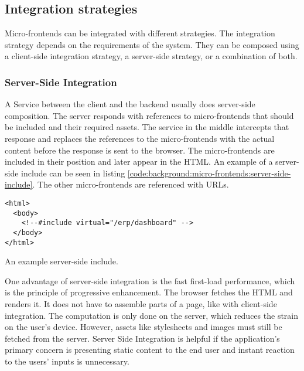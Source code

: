 \subsection{Integration strategies}\label{subsection:background:micro-frontend-architecture:integration-strategies}

Micro-frontends can be integrated with different strategies. The integration strategy depends on the requirements of the system. They can be composed using a client-side integration strategy, a server-side strategy, or a combination of both.

\subsubsection{Server-Side Integration}\label{subsubsection:background:micro-frontend-architecture:integration-strategies:server-side-integration}

A Service between the client and the backend usually does server-side composition. \cite[60]{book:2020:geers:background:micro-frontends:micro-frontends-in-action} The server responds with references to micro-frontends that should be included and their required assets. The service in the middle intercepts that response and replaces the references to the micro-frontends with the actual content before the response is sent to the browser. The micro-frontends are included in their position and later appear in the HTML. An example of a server-side include can be seen in listing \ref{code:background:micro-frontends:server-side-include}. The other micro-frontends are referenced with URLs. \cite[61-63]{book:2020:geers:background:micro-frontends:micro-frontends-in-action}

\ifshowListings
\begin{listing}[H]
    \begin{verbatim}
<html>
  <body>
    <!--#include virtual="/erp/dashboard" -->
  </body>
</html>
    \end{verbatim}
    \caption{An example server-side include.}\label{code:background:micro-frontends:server-side-include}
\end{listing}
\fi

\bigskip

\noindent One advantage of server-side integration is the fast first-load performance, which is the principle of progressive enhancement. \cite{book:2010:parker:background:micro-frontends:designing-with-progressive-enhancement} The browser fetches the HTML and renders it. It does not have to assemble parts of a page, like with client-side integration. The computation is only done on the server, which reduces the strain on the user's device. \cite{book:2020:geers:background:micro-frontends:micro-frontends-in-action} However, assets like stylesheets and images must still be fetched from the server. Server Side Integration is helpful if the application's primary concern is presenting static content to the end user and instant reaction to the users' inputs is unnecessary.  \cite[83]{book:2020:geers:background:micro-frontends:micro-frontends-in-action}

